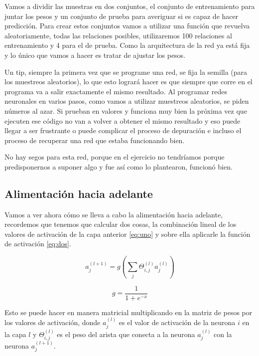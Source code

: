 Vamos a dividir las muestras en dos conjuntos, el conjunto de entrenamiento para juntar los pesos y un conjunto de prueba para averiguar si es capaz de hacer predicción. Para crear estos conjuntos vamos a utilizar  una función que revuelva aleatoriamente, todas las relaciones posibles, utilizaremos 100 relaciones al entrenamiento y 4 para el de prueba. Como la arquitectura de la red ya está fija y lo único que vamos a hacer es tratar de ajustar los pesos.

Un tip, siempre la primera vez que se programe una red, se fija la semilla (para los muestreos aleatorios), lo que esto logrará hacer es que siempre que corre en el programa va a salir exactamente el mismo resultado. Al programar redes neuronales en varios pasos, como vamos a utilizar muestreos aleatorios, se piden números al azar. Si prueban en valores y funciona muy bien la próxima vez que ejecuten ese código no van a volver a obtener el mismo resultado y eso puede llegar a ser frustrante o puede complicar  el proceso de depuración e incluso el proceso de recuperar una red que estaba funcionando bien. 

No hay segos para esta red, porque  en el ejercicio no tendríamos porque predisponernos a suponer algo y fue así como lo plantearon, funcionó bien. 

\subsection{Alimentación hacia adelante}

Vamos a ver ahora cómo se lleva a cabo la alimentación hacia adelante, recordemos que tenemos que calcular dos cosas, la combinación lineal de los valores de activación de la capa anterior \ref{eq:uno} y sobre ella aplicarle la función de activación \ref{eq:dos}.

\begin{equation}
 a_{j}^{(l+1)} = g\left(\sum_{j}\Theta_{i,j}^{(l)}a_{j}^{(l)} \right)
 \label{eq:uno}
\end{equation}

\begin{equation}
 g = \dfrac{1}{1+e^{-x}}
 \label{eq:dos}
\end{equation}

Esto se puede hacer en manera matricial multiplicando en la matriz de pesos por los valores de activación, donde $a_{j}^{(l)}$  es el valor de activación de la neurona  $i$  en la capa  $l$ y $\Theta_{i,j}^{(l)}$ es el peso del arista que conecta a la neurona  $a_{j}^{(l)}$ con la neurona $a_{j}^{(l+1)}$.

